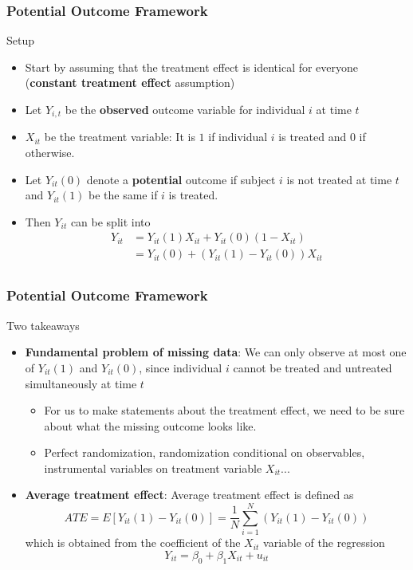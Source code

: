 \documentclass[compress]{beamer}
\begin{document}
\begin{frame}
\frametitle{Potential Outcome Framework}
Setup
\begin{itemize}
\item Start by assuming that the treatment effect is identical for everyone (\textbf{constant treatment effect} assumption)
\item  Let $Y_{i,t}$ be the \textbf{observed} outcome variable for individual $i$ at time $t$
\item  $X_{it}$ be the treatment variable: It is $1$ if individual $i$ is treated and $0$ if otherwise. 
\item Let $Y_{it}(0)$ denote a \textbf{potential} outcome if subject $i$ is not treated at time $t$ and $Y_{it}(1)$ be the same if $i$ is treated. 
\item Then $Y_{it}$ can be split into
\[
\begin{aligned}
Y_{it} & = Y_{it}(1)X_{it}+Y_{it}(0)(1-X_{it})\\
&=Y_{it}(0)+(Y_{it}(1)-Y_{it}(0))X_{it} \\
\end{aligned}
\] 
\end{itemize}
\end{frame}

\begin{frame}
\frametitle{Potential Outcome Framework}
Two takeaways
\begin{itemize}
\item \textbf{Fundamental problem of missing data}: We can only observe at most one of $Y_{it}(1)$ and $Y_{it}(0)$, since individual $i$ cannot be treated and untreated simultaneously at time $t$
\begin{itemize}
\item For us to make statements about the treatment effect, we need to be sure about what the missing outcome looks like. 
\item Perfect randomization, randomization conditional on observables, instrumental variables on treatment variable $X_{it}$...
\end{itemize}
\item \textbf{Average treatment effect}: Average treatment effect is defined as
\small{\[
ATE = E[Y_{it}(1)-Y_{it}(0)]=\frac{1}{N}\sum_{i=1}^N(Y_{it}(1)-Y_{it}(0))
\]}\normalsize
which is obtained from the coefficient of the $X_{it}$ variable of the regression
\[
Y_{it}=\beta_0+\beta_1X_{it}+u_{it}
\]
\end{itemize}
\end{frame}
\end{document}
